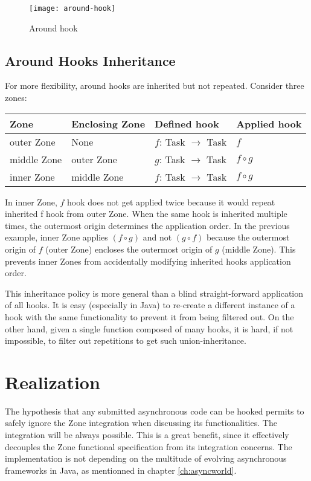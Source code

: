 \begin{figure}[h]
  \centering
  \texttt{[image: around-hook]}
  \caption{Around hook}
  \label{fig:around-hook}
\end{figure}

\subsection*{Around Hooks Inheritance}

For more flexibility, around hooks are inherited but not repeated. Consider three zones:

\begin{tabular}{|l|l|l|l|}
\hline
\textbf{Zone} & \textbf{Enclosing Zone} & \textbf{Defined hook} & \textbf{Applied hook}
\\\hline
outer Zone & None & $f$: Task $\rightarrow$ Task & $f$
\\\hline
middle Zone & outer Zone & $g$: Task $\rightarrow$ Task & $f \circ g$
\\\hline
inner Zone & middle Zone & $f$: Task $\rightarrow$ Task & $f \circ g$
\\\hline
\end{tabular}

In inner Zone, $f$ hook does not get applied twice because it would repeat inherited f hook from outer Zone. When the same hook is inherited multiple times, the outermost origin determines the application order. In the previous example, inner Zone applies $( f \circ g )$ and not $( g \circ f )$ because the outermost origin of $f$ (outer Zone) encloses the outermost origin of $g$ (middle Zone). This prevents inner Zones from accidentally modifying inherited hooks application order.

This inheritance policy is more general than a blind straight-forward application of all hooks. It is easy (especially in Java) to re-create a different instance of a hook with the same functionality to prevent it from being filtered out. On the other hand, given a single function composed of many hooks, it is hard, if not impossible, to filter out repetitions to get such union-inheritance.

\section{Realization}
\label{sec:realization}

The hypothesis that any submitted asynchronous code can be hooked permits to safely ignore the Zone integration when discussing its functionalities. The integration will be always possible. This is a great benefit, since it effectively decouples the Zone functional specification from its integration concerns. The implementation is not depending on the multitude of evolving asynchronous frameworks in Java, as mentionned in chapter \ref{ch:asyncworld}.

